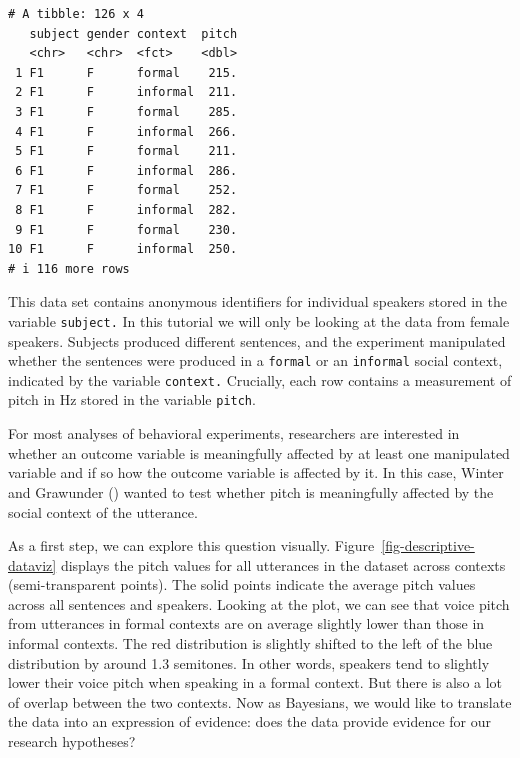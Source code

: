 \documentclass[
  doc,
  floatsintext,
  longtable,
  nolmodern,
  notxfonts,
  notimes,
  colorlinks=true,linkcolor=blue,citecolor=blue,urlcolor=blue]{apa7}
\begin{document}
\begin{verbatim}
# A tibble: 126 x 4
   subject gender context  pitch
   <chr>   <chr>  <fct>    <dbl>
 1 F1      F      formal    215.
 2 F1      F      informal  211.
 3 F1      F      formal    285.
 4 F1      F      informal  266.
 5 F1      F      formal    211.
 6 F1      F      informal  286.
 7 F1      F      formal    252.
 8 F1      F      informal  282.
 9 F1      F      formal    230.
10 F1      F      informal  250.
# i 116 more rows
\end{verbatim}

This data set contains anonymous identifiers for individual speakers
stored in the variable \texttt{subject.} In this tutorial we will only
be looking at the data from female speakers. Subjects produced diﬀerent
sentences, and the experiment manipulated whether the sentences were
produced in a \texttt{formal} or an \texttt{informal} social context,
indicated by the variable \texttt{context.} Crucially, each row contains
a measurement of pitch in Hz stored in the variable \texttt{pitch}.

For most analyses of behavioral experiments, researchers are interested
in whether an outcome variable is meaningfully affected by at least one
manipulated variable and if so how the outcome variable is affected by
it. In this case, Winter and Grawunder
()
wanted to test whether pitch is meaningfully affected by the social
context of the utterance.

As a first step, we can explore this question visually.
Figure~\ref{fig-descriptive-dataviz} displays the pitch values for all
utterances in the dataset across contexts (semi-transparent points). The
solid points indicate the average pitch values across all sentences and
speakers. Looking at the plot, we can see that voice pitch from
utterances in formal contexts are on average slightly lower than those
in informal contexts. The red distribution is slightly shifted to the
left of the blue distribution by around 1.3 semitones. In other words,
speakers tend to slightly lower their voice pitch when speaking in a
formal context. But there is also a lot of overlap between the two
contexts. Now as Bayesians, we would like to translate the data into an
expression of evidence: does the data provide evidence for our research
hypotheses?
\end{document}
